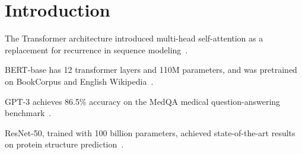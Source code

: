 \section{Introduction}


The Transformer architecture introduced multi-head self-attention as a
replacement for recurrence in sequence
modeling~\cite{vaswani2017attention}.

BERT-base has 12 transformer layers and 110M parameters, and was pretrained on
BookCorpus and English Wikipedia~\cite{devlin2019bert}.

GPT-3 achieves 86.5\% accuracy on the MedQA medical question-answering
benchmark~\cite{brown2020language}.

ResNet-50, trained with 100 billion parameters, achieved state-of-the-art
results on protein structure prediction~\cite{he2016resnet}.

